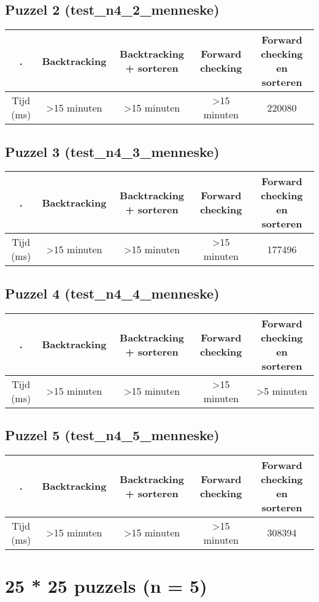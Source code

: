 \documentclass[]{report}
\begin{document}
\begin{appendices}
\subsection{Puzzel 2 (test\_n4\_2\_menneske)}
\begin{tabular}{|c||c|c|c|c|}
\hline . & Backtracking & Backtracking + sorteren & Forward checking & Forward checking en sorteren \\ 
\hline \hline Tijd (ms) & \textgreater 15 minuten & \textgreater 15 minuten & \textgreater 15 minuten & 220080 \\ 
\hline 
\end{tabular}
\subsection{Puzzel 3 (test\_n4\_3\_menneske)}
\begin{tabular}{|c||c|c|c|c|}
\hline . & Backtracking & Backtracking + sorteren & Forward checking & Forward checking en sorteren \\ 
\hline \hline Tijd (ms) & \textgreater 15 minuten & \textgreater 15 minuten & \textgreater 15 minuten & 177496 \\ 
\hline 
\end{tabular}
\subsection{Puzzel 4 (test\_n4\_4\_menneske)}
\begin{tabular}{|c||c|c|c|c|}
\hline . & Backtracking & Backtracking + sorteren & Forward checking & Forward checking en sorteren \\ 
\hline \hline Tijd (ms) & \textgreater 15 minuten & \textgreater 15 minuten & \textgreater 15 minuten & \textgreater 5 minuten \\ 
\hline 
\end{tabular}
\subsection{Puzzel 5 (test\_n4\_5\_menneske)}
\begin{tabular}{|c||c|c|c|c|}
\hline . & Backtracking & Backtracking + sorteren & Forward checking & Forward checking en sorteren \\ 
\hline \hline Tijd (ms) & \textgreater 15 minuten & \textgreater 15 minuten & \textgreater 15 minuten & 308394 \\ 
\hline 
\end{tabular}
\section{25 * 25 puzzels (n = 5)}

\end{appendices}
\end{document}
